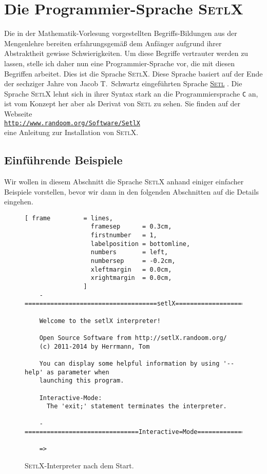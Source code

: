 \chapter{Die Programmier-Sprache \textsc{SetlX}}
Die in der Mathematik-Vorlesung vorgestellten Begriffs-Bildungen aus der Mengenlehre bereiten
erfahrungsgemäß dem Anfänger aufgrund ihrer Abstraktheit gewisse Schwierigkeiten.  Um
diese Begriffe vertrauter werden zu lassen, stelle ich daher nun eine Programmier-Sprache
vor, die mit diesen Begriffen arbeitet.  Dies ist die Sprache \textsc{SetlX}.
Diese Sprache basiert auf der Ende der sechziger Jahre von Jacob T.~Schwartz eingeführten
Sprache \href{http://en.wikipedia.org/wiki/SETL}{\textsc{Setl}} \cite{setl86}.  
Die Sprache \textsc{SetlX} lehnt sich in ihrer Syntax stark an die Programmiersprache \texttt{C} an,
ist vom Konzept her aber als Derivat von \textsc{Setl} zu sehen. Sie finden auf der Webseite 
\\[0.2cm]
\hspace*{1.3cm}
\href{http://www.randoom.org/Software/SetlX}{\texttt{http://www.randoom.org/Software/SetlX}}
\\[0.2cm]
eine Anleitung zur Installation von \textsc{SetlX}.

\section{Einführende Beispiele}
Wir wollen in diesem Abschnitt die Sprache \textsc{SetlX} anhand einiger einfacher
Beispiele vorstellen, bevor wir dann in den folgenden Abschnitten auf die Details
eingehen.  

\begin{figure}[!ht]
\centering
\begin{Verbatim}[ frame         = lines, 
                  framesep      = 0.3cm, 
                  firstnumber   = 1,
                  labelposition = bottomline,
                  numbers       = left,
                  numbersep     = -0.2cm,
                  xleftmargin   = 0.0cm,
                  xrightmargin  = 0.0cm,
                ]
    -====================================setlX=============================v2.3.2=-
    
    Welcome to the setlX interpreter!
    
    Open Source Software from http://setlX.randoom.org/
    (c) 2011-2014 by Herrmann, Tom
    
    You can display some helpful information by using '--help' as parameter when
    launching this program.
    
    Interactive-Mode:
      The 'exit;' statement terminates the interpreter.
    
    -===============================Interactive=Mode==============================-
    
    => 
\end{Verbatim}
\vspace*{-0.3cm}
\caption{\textsc{SetlX}-Interpreter nach dem Start.}
\label{fig:setlx}
\end{figure}

